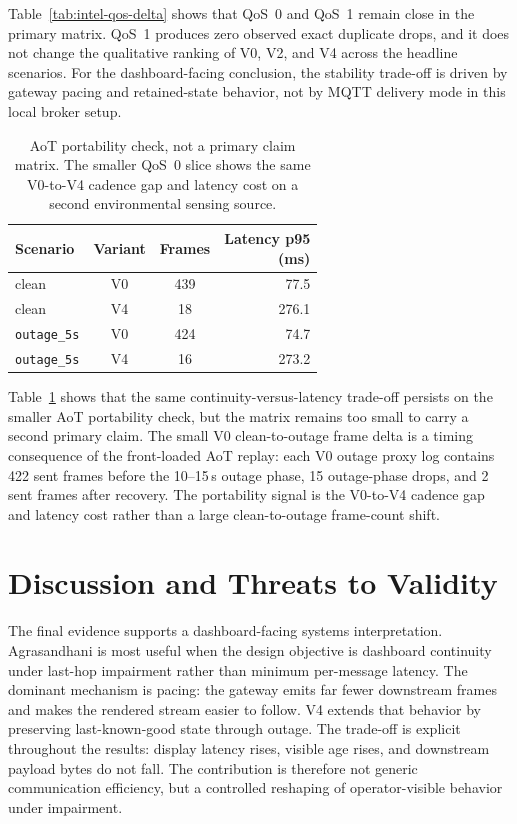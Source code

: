 \documentclass[sigconf,authorversion,nonacm]{acmart}
\begin{document}
Table~\ref{tab:intel-qos-delta} shows that QoS~0 and QoS~1 remain close in the primary matrix. QoS~1 produces zero observed exact duplicate drops, and it does not change the qualitative ranking of V0, V2, and V4 across the headline scenarios. For the dashboard-facing conclusion, the stability trade-off is driven by gateway pacing and retained-state behavior, not by MQTT delivery mode in this local broker setup.

\begin{table}[H]
\centering
\caption{AoT portability check, not a primary claim matrix. The smaller QoS~0 slice shows the same V0-to-V4 cadence gap and latency cost on a second environmental sensing source.}
\label{tab:aot-summary}
\scriptsize
\setlength{\tabcolsep}{4pt}
\renewcommand{\arraystretch}{0.96}
\begin{adjustbox}{max width=\columnwidth}
\begin{tabular}{@{}lccr@{}}
\toprule
Scenario & Variant & Frames & \makecell[r]{Latency p95\\(ms)} \\
\midrule
clean & V0 & 439 & 77.5 \\
clean & V4 & 18 & 276.1 \\
\nolinkurl{outage_5s} & V0 & 424 & 74.7 \\
\nolinkurl{outage_5s} & V4 & 16 & 273.2 \\
\bottomrule
\end{tabular}
\end{adjustbox}
\end{table}

Table~\ref{tab:aot-summary} shows that the same continuity-versus-latency trade-off persists on the smaller AoT portability check, but the matrix remains too small to carry a second primary claim. The small V0 clean-to-outage frame delta is a timing consequence of the front-loaded AoT replay: each V0 outage proxy log contains 422 sent frames before the 10--15\,s outage phase, 15 outage-phase drops, and 2 sent frames after recovery. The portability signal is the V0-to-V4 cadence gap and latency cost rather than a large clean-to-outage frame-count shift.

\FloatBarrier
\section{Discussion and Threats to Validity}

The final evidence supports a dashboard-facing systems interpretation. Agrasandhani is most useful when the design objective is dashboard continuity under last-hop impairment rather than minimum per-message latency. The dominant mechanism is pacing: the gateway emits far fewer downstream frames and makes the rendered stream easier to follow. V4 extends that behavior by preserving last-known-good state through outage. The trade-off is explicit throughout the results: display latency rises, visible age rises, and downstream payload bytes do not fall. The contribution is therefore not generic communication efficiency, but a controlled reshaping of operator-visible behavior under impairment.
\end{document}
